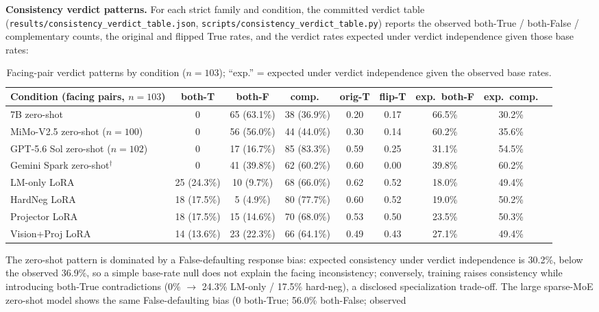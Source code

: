 \textbf{Consistency verdict patterns.} For each strict family and condition,
the committed verdict table
(\texttt{results/consistency\_verdict\_table.\allowbreak{}json},
\texttt{scripts/consistency\_verdict\_table.py}) reports the observed
both-True / both-False / complementary counts, the original and flipped True
rates, and the verdict rates expected under verdict independence given those
base rates:

\begin{table}[h]
\centering
\footnotesize
\caption{Facing-pair verdict patterns by condition ($n{=}103$); ``exp.'' =
expected under verdict independence given the observed base rates.}
\label{tab:verdicts}
\begin{tabular}{lcccccccc}
\toprule
Condition (facing pairs, $n{=}103$) & both-T & both-F & comp.\ & orig-T & flip-T & exp.\ both-F & exp.\ comp. \\
\midrule
7B zero-shot & 0 & 65 (63.1\%) & 38 (36.9\%) & 0.20 & 0.17 & 66.5\% & 30.2\% \\
MiMo-V2.5 zero-shot ($n{=}100$) & 0 & 56 (56.0\%) & 44 (44.0\%) & 0.30 & 0.14 & 60.2\% & 35.6\% \\
GPT-5.6 Sol zero-shot ($n{=}102$) & 0 & 17 (16.7\%) & 85 (83.3\%) & 0.59 & 0.25 & 31.1\% & 54.5\% \\
Gemini Spark zero-shot$^{\dagger}$ & 0 & 41 (39.8\%) & 62 (60.2\%) & 0.60 & 0.00 & 39.8\% & 60.2\% \\
LM-only LoRA & 25 (24.3\%) & 10 (9.7\%) & 68 (66.0\%) & 0.62 & 0.52 & 18.0\% & 49.4\% \\
HardNeg LoRA & 18 (17.5\%) & 5 (4.9\%) & 80 (77.7\%) & 0.60 & 0.52 & 19.0\% & 50.2\% \\
Projector LoRA & 18 (17.5\%) & 15 (14.6\%) & 70 (68.0\%) & 0.53 & 0.50 & 23.5\% & 50.3\% \\
Vision+Proj LoRA & 14 (13.6\%) & 23 (22.3\%) & 66 (64.1\%) & 0.49 & 0.43 & 27.1\% & 49.4\% \\
\bottomrule
\end{tabular}
\end{table}
The zero-shot pattern is dominated by a False-defaulting response bias:
expected consistency under verdict independence is 30.2\%, below the observed
36.9\%, so a simple base-rate null does not explain the facing inconsistency;
conversely, training raises consistency while introducing both-True
contradictions (0\% $\rightarrow$ 24.3\% LM-only / 17.5\% hard-neg), a
disclosed specialization trade-off. The large sparse-MoE zero-shot model shows
the same False-defaulting bias (0 both-True; 56.0\% both-False; observed
